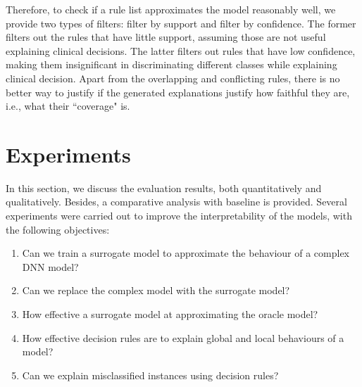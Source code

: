\hspace*{3.5mm} Therefore, to check if a rule list approximates the model reasonably well, we provide two types of filters: filter by support and filter by confidence. The former filters out the rules that have little support, assuming those are not useful explaining clinical decisions. The latter filters out rules that have low confidence, making them insignificant in discriminating different classes while explaining clinical decision. Apart from the overlapping and conflicting rules, there is no better way to justify if the generated explanations justify how faithful they are, i.e., what their ``coverage" is. 



\section{Experiments} \label{chapter_7:results}
In this section, we discuss the evaluation results, both quantitatively and qualitatively. Besides, a comparative analysis with baseline is provided. Several experiments were carried out to improve the interpretability of the models, with the following objectives: 

\begin{enumerate}[noitemsep]
    \item Can we train a surrogate model to approximate the behaviour of a complex DNN model? 
    \item Can we replace the complex model with the surrogate model? 
    \item How effective a surrogate model at approximating the oracle model?  
    \item How effective decision rules are to explain global and local behaviours of a model?   
    \item Can we explain misclassified instances using decision rules? 
\end{enumerate}

